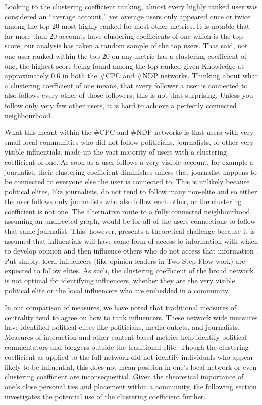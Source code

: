 \documentclass[a4paper,12pt]{article}
\begin{document}
Looking to the clustering coefficient ranking, almost every highly ranked user was considered an ``average account,'' yet average users only appeared once or twice among the top 20 most highly ranked for most other metrics. It is notable that far more than 20 accounts have clustering coefficients of one which is the top score, our analysis has taken a random sample of the top users. That said, not one user ranked within the top 20 on any metric has a clustering coefficient of one, the highest score being found among the top ranked given Knowledge at approximately 0.6 in both the \#CPC and \#NDP networks. Thinking about what a clustering coefficient of one means, that every follower a user is connected to also follows every other of those followers, this is not that surprising. Unless you follow only very few other users, it is hard to achieve a perfectly connected neighbourhood. 

What this meant within the \#CPC and \#NDP networks is that users with very small local communities who did not follow politicians, journalists, or other very visible influentials, made up the vast majority of users with a clustering coefficient of one. As soon as a user follows a very visible account, for example a journalist, their clustering coefficient diminishes unless that journalist happens to be connected to everyone else the user is connected to. This is unlikely because political elites, like journalists, do not tend to follow many non-elite and so either the user follows only journalists who also follow each other, or the clustering coefficient is not one. The alternative route to a fully connected neighbourhood, assuming an undirected graph, would be for all of the users connections to follow that same journalist. This, however, presents a theoretical challenge because it is assumed that influentials will have some form of access to information with which to develop opinion and then influence others who do not access that information \cite{katzlazarsfeld}. Put simply, local influencers (like opinion leaders in Two-Step Flow work) are expected to follow elites. As such, the clustering coefficient of  the broad network is not optimal for identifying influencers, whether they are the very visible political elite or the local influencers who are embedded in a community.

In our comparison of measures, we have noted that traditional measures of centrality tend to agree on how to rank influencers. These network wide measures have identified political elites like politicians, media outlets, and journalists. Measures of interaction and other content based metrics help identify political commentators and bloggers outside the traditional elite. Though the clustering coefficient as applied to the full network did not identify individuals who appear likely to be influential, this does not mean position in one's local network or even clustering coefficient are inconsequential. Given the theoretical importance of one's close personal ties and placement within a community, the following section investigates the potential use of the clustering coefficient further.
\end{document}
